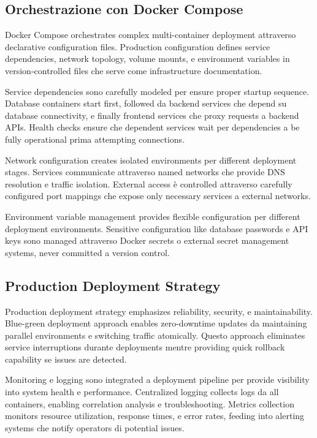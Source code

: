 \documentclass[12pt,a4paper]{article}
\begin{document}
\subsection{Orchestrazione con Docker Compose}

Docker Compose orchestrates complex multi-container deployment attraverso declarative configuration files. Production configuration defines service dependencies, network topology, volume mounts, e environment variables in version-controlled files che serve come infrastructure documentation.

Service dependencies sono carefully modeled per ensure proper startup sequence. Database containers start first, followed da backend services che depend su database connectivity, e finally frontend services che proxy requests a backend APIs. Health checks ensure che dependent services wait per dependencies a be fully operational prima attempting connections.

Network configuration creates isolated environments per different deployment stages. Services communicate attraverso named networks che provide DNS resolution e traffic isolation. External access è controlled attraverso carefully configured port mappings che expose only necessary services a external networks.

Environment variable management provides flexible configuration per different deployment environments. Sensitive configuration like database passwords e API keys sono managed attraverso Docker secrets o external secret management systems, never committed a version control.

\subsection{Production Deployment Strategy}

Production deployment strategy emphasizes reliability, security, e maintainability. Blue-green deployment approach enables zero-downtime updates da maintaining parallel environments e switching traffic atomically. Questo approach eliminates service interruptions durante deployments mentre providing quick rollback capability se issues are detected.

Monitoring e logging sono integrated a deployment pipeline per provide visibility into system health e performance. Centralized logging collects logs da all containers, enabling correlation analysis e troubleshooting. Metrics collection monitors resource utilization, response times, e error rates, feeding into alerting systems che notify operators di potential issues.
\end{document}
